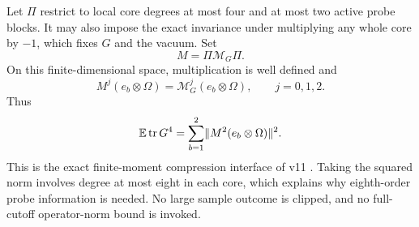\documentclass[11pt]{article}
\numberwithin{equation}{section}
\theoremstyle{definition}\newtheorem{definition}[theorem]{Definition}
\theoremstyle{remark}\newtheorem{remark}[theorem]{Remark}
\newcommand{\tr}{\operatorname{tr}}\newcommand{\Ent}{\operatorname{Ent}}
\newcommand{\norm}[1]{\lVert#1\rVert}\newcommand{\ip}[2]{\langle#1,#2\rangle}
\begin{document}
Let $\Pi$ restrict to local core degrees at most four and at most two active
probe blocks. It may also impose the exact invariance under multiplying any
whole core by $-1$, which fixes $G$ and the vacuum. Set
\[
 M=\Pi\mathcal M_G\Pi.
\]
On this finite-dimensional space, multiplication is well defined and
\begin{equation}\label{eq:cutoff}
 M^j(e_b\otimes\Omega)=\mathcal M_G^j(e_b\otimes\Omega),
 \qquad j=0,1,2.
\end{equation}
Thus
\begin{equation}\label{eq:cutoffenergy}
 \E\tr G^4=\sum_{b=1}^2\norm{M^2(e_b\otimes\Omega)}^2.
\end{equation}
This is the exact finite-moment compression interface of v11 \cite{Framework}.
Taking the squared norm involves degree at most eight in each core, which
explains why eighth-order probe information is needed. No large sample outcome
is clipped, and no full-cutoff operator-norm bound is invoked.
\end{document}
